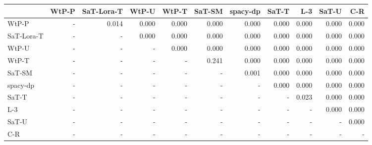 \begin{tabular}{lrrrrrrrrrr}
\toprule
 & WtP-P & SaT-Lora-T & WtP-U & WtP-T & SaT-SM & spacy-dp & SaT-T & L-3 & SaT-U & C-R \\
\midrule
WtP-P & - & 0.014 & 0.000 & 0.000 & 0.000 & 0.000 & 0.000 & 0.000 & 0.000 & 0.000 \\
SaT-Lora-T & - & - & 0.000 & 0.000 & 0.000 & 0.000 & 0.000 & 0.000 & 0.000 & 0.000 \\
WtP-U & - & - & - & 0.000 & 0.000 & 0.000 & 0.000 & 0.000 & 0.000 & 0.000 \\
WtP-T & - & - & - & - & 0.241 & 0.000 & 0.000 & 0.000 & 0.000 & 0.000 \\
SaT-SM & - & - & - & - & - & 0.001 & 0.000 & 0.000 & 0.000 & 0.000 \\
spacy-dp & - & - & - & - & - & - & 0.000 & 0.000 & 0.000 & 0.000 \\
SaT-T & - & - & - & - & - & - & - & 0.023 & 0.000 & 0.000 \\
L-3 & - & - & - & - & - & - & - & - & 0.000 & 0.000 \\
SaT-U & - & - & - & - & - & - & - & - & - & 0.000 \\
C-R & - & - & - & - & - & - & - & - & - & - \\
\bottomrule
\end{tabular}

